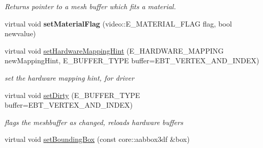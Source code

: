 \begin{DoxyCompactItemize}
\begin{DoxyCompactList}\small\item\em Returns pointer to a mesh buffer which fits a material. \end{DoxyCompactList}\item 
\hypertarget{classirr_1_1scene_1_1_c_animated_mesh_half_life_a9fde0c60534db7f4656aead3f0de6810}{virtual void {\bfseries set\-Material\-Flag} (video\-::\-E\-\_\-\-M\-A\-T\-E\-R\-I\-A\-L\-\_\-\-F\-L\-A\-G flag, bool newvalue)}\label{classirr_1_1scene_1_1_c_animated_mesh_half_life_a9fde0c60534db7f4656aead3f0de6810}

\item 
\hypertarget{classirr_1_1scene_1_1_c_animated_mesh_half_life_ac8242938bbbf687136f9a9acbaa54b0a}{virtual void \hyperlink{classirr_1_1scene_1_1_c_animated_mesh_half_life_ac8242938bbbf687136f9a9acbaa54b0a}{set\-Hardware\-Mapping\-Hint} (E\-\_\-\-H\-A\-R\-D\-W\-A\-R\-E\-\_\-\-M\-A\-P\-P\-I\-N\-G new\-Mapping\-Hint, E\-\_\-\-B\-U\-F\-F\-E\-R\-\_\-\-T\-Y\-P\-E buffer=E\-B\-T\-\_\-\-V\-E\-R\-T\-E\-X\-\_\-\-A\-N\-D\-\_\-\-I\-N\-D\-E\-X)}\label{classirr_1_1scene_1_1_c_animated_mesh_half_life_ac8242938bbbf687136f9a9acbaa54b0a}

\begin{DoxyCompactList}\small\item\em set the hardware mapping hint, for driver \end{DoxyCompactList}\item 
\hypertarget{classirr_1_1scene_1_1_c_animated_mesh_half_life_a38f522dfa4c1fe2fda6a0f13fdd42e00}{virtual void \hyperlink{classirr_1_1scene_1_1_c_animated_mesh_half_life_a38f522dfa4c1fe2fda6a0f13fdd42e00}{set\-Dirty} (E\-\_\-\-B\-U\-F\-F\-E\-R\-\_\-\-T\-Y\-P\-E buffer=E\-B\-T\-\_\-\-V\-E\-R\-T\-E\-X\-\_\-\-A\-N\-D\-\_\-\-I\-N\-D\-E\-X)}\label{classirr_1_1scene_1_1_c_animated_mesh_half_life_a38f522dfa4c1fe2fda6a0f13fdd42e00}

\begin{DoxyCompactList}\small\item\em flags the meshbuffer as changed, reloads hardware buffers \end{DoxyCompactList}\item 
\hypertarget{classirr_1_1scene_1_1_c_animated_mesh_half_life_a8f76ffb1c347f055858cdda1d6bf71a5}{virtual void \hyperlink{classirr_1_1scene_1_1_c_animated_mesh_half_life_a8f76ffb1c347f055858cdda1d6bf71a5}{set\-Bounding\-Box} (const core\-::aabbox3df \&box)}\label{classirr_1_1scene_1_1_c_animated_mesh_half_life_a8f76ffb1c347f055858cdda1d6bf71a5}


\end{DoxyCompactItemize}
